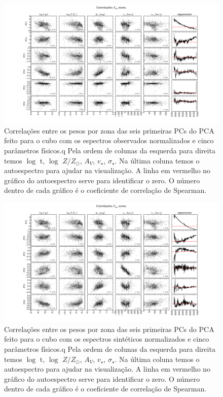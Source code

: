 \begin{figure}
    \includegraphics[width=1.3\textwidth, angle=-90]{figuras/K0008-correl-f_obs_norm-PCvsPhys.pdf}
	\caption[Correlações PCs vs. par\^ametros f\'isicos - $F_{obs}$ norm. - NGC 0001]
    {Correlações entre os pesos por zona das seis primeiras PCs do PCA feito para o cubo com os espectros observados
    normalizados e cinco parâmetros físicos.q Pela ordem de colunas da esquerda para direita temos $\log$ t, $\log$ $Z /
    Z_{\odot}$, $A_V$, $v_{\star}$, $\sigma_{\star}$. Na última coluna temos o autoespectro para ajudar na visualização.
    A linha em vermelho no gráfico do autoespectro serve para identificar o zero. O número dentro de cada gráfico é o
    coeficiente de correlação de Spearman.}
    \label{fig:K0008correfobsnorm}
\end{figure}

\begin{figure}
    \includegraphics[width=1.3\textwidth, angle=-90]{figuras/K0008-correl-f_syn_norm-PCvsPhys.pdf}
	\caption[Correlações PCs vs. par\^ametros f\'isicos - $F_{syn}$ norm. - NGC 0001]
    {Correlações entre os pesos por zona das seis primeiras PCs do PCA feito para o cubo com os espectros sintéticos
    normalizados e cinco parâmetros físicos.q Pela ordem de colunas da esquerda para direita temos $\log$ t, $\log$ $Z /
    Z_{\odot}$, $A_V$, $v_{\star}$, $\sigma_{\star}$. Na última coluna temos o autoespectro para ajudar na visualização.
    A linha em vermelho no gráfico do autoespectro serve para identificar o zero. O número dentro de cada gráfico é o
    coeficiente de correlação de Spearman.}
    \label{fig:K0008correfsynnorm}
\end{figure}

